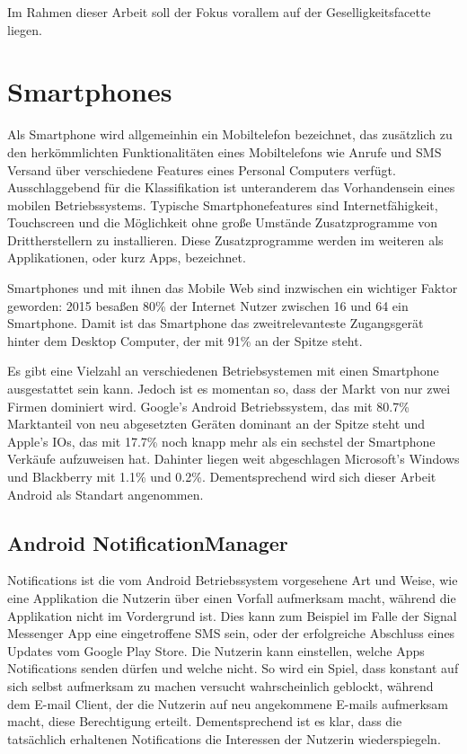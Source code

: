 Im Rahmen dieser Arbeit soll der Fokus vorallem auf der Geselligkeitsfacette liegen.

\section{Smartphones}

Als Smartphone wird allgemeinhin ein Mobiltelefon bezeichnet, das zusätzlich zu den herkömmlichten Funktionalitäten eines Mobiltelefons wie Anrufe und SMS Versand über verschiedene Features eines Personal Computers verfügt. 
Ausschlaggebend für die Klassifikation ist unteranderem das Vorhandensein eines mobilen Betriebssystems.
Typische Smartphonefeatures sind Internetfähigkeit, Touchscreen und die Möglichkeit ohne große Umstände Zusatzprogramme von Drittherstellern zu installieren.
Diese Zusatzprogramme werden im weiteren als Applikationen, oder kurz Apps, bezeichnet.
\par

Smartphones und mit ihnen das Mobile Web sind inzwischen ein wichtiger Faktor geworden:
2015 besaßen 80\% der Internet Nutzer zwischen 16 und 64 ein Smartphone. 
Damit ist das Smartphone das zweitrelevanteste Zugangsgerät hinter dem Desktop Computer, der mit 91\% an der Spitze steht. \cite{globalwebindex}
\par

Es gibt eine Vielzahl an verschiedenen Betriebsystemen mit einen Smartphone ausgestattet sein kann.
Jedoch ist es momentan so, dass der Markt von nur zwei Firmen dominiert wird.
Google's Android Betriebssystem, das mit 80.7\% Marktanteil von neu abgesetzten Geräten dominant an der Spitze steht
und Apple's IOs, das mit 17.7\% noch knapp mehr als ein sechstel der Smartphone Verkäufe aufzuweisen hat.
Dahinter liegen weit abgeschlagen Microsoft's Windows und Blackberry mit 1.1\% und 0.2\%\cite{smartphonemarktanteil}.
Dementsprechend wird sich dieser Arbeit Android als Standart angenommen.


\subsection {Android NotificationManager}

Notifications ist die vom Android Betriebssystem vorgesehene Art und Weise, 
wie eine Applikation die Nutzerin über einen Vorfall aufmerksam macht, während die Applikation nicht im Vordergrund ist.
Dies kann zum Beispiel im Falle der Signal Messenger App eine eingetroffene SMS sein,
oder der erfolgreiche Abschluss eines Updates vom Google Play Store.
Die Nutzerin kann einstellen, welche Apps Notifications senden dürfen und welche nicht.
So wird ein Spiel, dass konstant auf sich selbst aufmerksam zu machen versucht wahrscheinlich geblockt,
während dem E-mail Client, der die Nutzerin auf neu angekommene E-mails aufmerksam macht, diese Berechtigung erteilt.
Dementsprechend ist es klar, dass die tatsächlich erhaltenen Notifications die Interessen der Nutzerin wiederspiegeln.
\par

